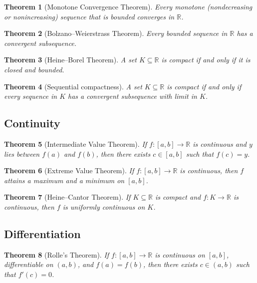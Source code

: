 \documentclass[12pt]{article}
\numberwithin{equation}{section}
\newcommand{\RR}{\mathbb{R}}
\theoremstyle{plain}
\newtheorem{theorem}{Theorem}[section]
\theoremstyle{definition}
\theoremstyle{remark}
\begin{document}
\begin{theorem}[Monotone Convergence Theorem]
Every monotone (nondecreasing or nonincreasing) sequence that is bounded converges in $\RR$.
\end{theorem}

\begin{theorem}[Bolzano--Weierstrass Theorem]
Every bounded sequence in $\RR$ has a convergent subsequence.
\end{theorem}

\begin{theorem}[Heine--Borel Theorem]
A set $K\subseteq\RR$ is compact if and only if it is closed and bounded.
\end{theorem}

\begin{theorem}[Sequential compactness]
A set $K\subseteq\RR$ is compact if and only if every sequence in $K$ has a convergent subsequence with limit in $K$.
\end{theorem}

\subsection{Continuity}

\begin{theorem}[Intermediate Value Theorem]
If $f:[a,b]\to\RR$ is continuous and $y$ lies between $f(a)$ and $f(b)$,
then there exists $c\in[a,b]$ such that $f(c)=y$.
\end{theorem}

\begin{theorem}[Extreme Value Theorem]
If $f:[a,b]\to\RR$ is continuous, then $f$ attains a maximum and a minimum on $[a,b]$.
\end{theorem}

\begin{theorem}[Heine--Cantor Theorem]
If $K\subseteq\RR$ is compact and $f:K\to\RR$ is continuous, then $f$ is uniformly continuous on $K$.
\end{theorem}

\subsection{Differentiation}

\begin{theorem}[Rolle's Theorem]
If $f:[a,b]\to\RR$ is continuous on $[a,b]$, differentiable on $(a,b)$, and $f(a)=f(b)$,
then there exists $c\in(a,b)$ such that $f'(c)=0$.
\end{theorem}
\end{document}
